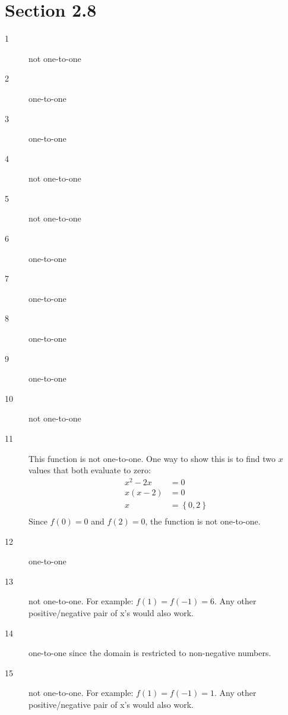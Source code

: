 \documentclass{exam}
\begin{document}
  \pagebreak

  \section{Section 2.8}

  \begin{description}

    \item[1] not one-to-one
      
    \item[2] one-to-one
      
    \item[3] one-to-one
      
    \item[4] not one-to-one
      
    \item[5] not one-to-one
      
    \item[6] one-to-one
      
    \item[7] one-to-one

    \item[8] one-to-one

    \item[9] one-to-one
      
    \item[10] not one-to-one
      
    \item[11] This function is not one-to-one.  One way to show this is to find two $x$ values that both evaluate to
      zero:
      \begin{align*}
        x^2 - 2x &= 0 \\
        x(x - 2) &= 0 \\
        x &= \left\{ 0, 2 \right\} \\
      \end{align*}
      Since $f(0) = 0$ and $f(2) = 0$, the function is not one-to-one.
      
    \item[12] one-to-one

    \item[13] not one-to-one.  For example: $f(1) = f(-1) = 6$.  Any other positive/negative pair of x's would also work.

    \item[14] one-to-one since the domain is restricted to non-negative numbers.

    \item[15] not one-to-one.  For example: $f(1) = f(-1) = 1$.  Any other positive/negative pair of x's would also work.


\end{description}
\end{document}

